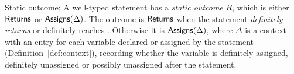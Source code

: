 \begin{specdefinition}{Static outcome; }
A well-typed statement has a \emph{static outcome} $R$, which is either $\mathsf{Returns}$ or $\mathsf{Assigns}(\Delta)$. The
outcome is $\mathsf{Returns}$ when the statement \emph{definitely returns} or definitely reaches .
Otherwise it is $\mathsf{Assigns}(\Delta)$, where $\Delta$ is a context with an entry for each variable declared or assigned
by the statement (Definition~\ref{def:context}), recording whether the variable is definitely assigned, definitely
unassigned or possibly unassigned after the statement.
\end{specdefinition}
